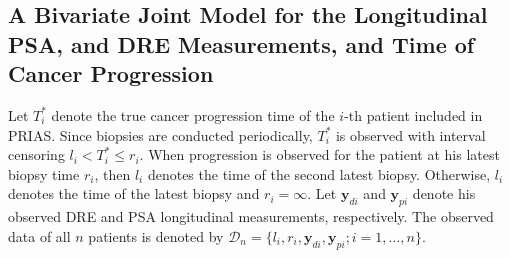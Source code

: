 \subsection{A Bivariate Joint Model for the Longitudinal PSA, and DRE Measurements, and Time of Cancer Progression}
Let $T_i^*$ denote the true cancer progression time of the ${i\mbox{-th}}$ patient included in PRIAS. Since biopsies are conducted periodically, $T_i^*$ is observed with interval censoring ${l_i < T_i^* \leq r_i}$. When progression is observed for the patient at his latest biopsy time $r_i$, then $l_i$ denotes the time of the second latest biopsy. Otherwise, $l_i$ denotes the time of the latest biopsy and ${r_i=\infty}$. Let $\boldsymbol{y}_{di}$ and $\boldsymbol{y}_{pi}$ denote his observed DRE and PSA longitudinal measurements, respectively. The observed data of all $n$ patients is denoted by ${\mathcal{D}_n = \{l_i, r_i, \boldsymbol{y}_{di}, \boldsymbol{y}_{pi}; i = 1, \ldots, n\}}$.

